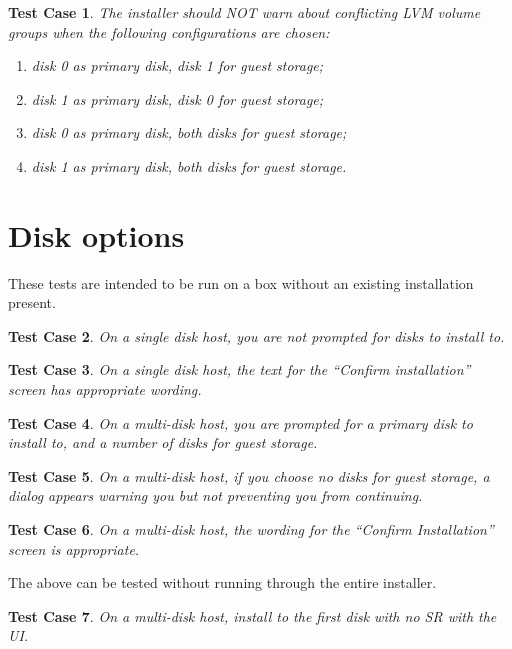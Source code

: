 \documentclass[a4paper]{article}
\newtheorem{testcase}{Test Case}
\begin{document}
\begin{testcase}
The installer should NOT warn about conflicting LVM volume groups when
the following configurations are chosen:
\begin{enumerate}
\item disk 0 as primary disk, disk 1 for guest storage;
\item disk 1 as primary disk, disk 0 for guest storage;
\item disk 0 as primary disk, both disks for guest storage;
\item disk 1 as primary disk, both disks for guest storage.
\end{enumerate}
\end{testcase}

\section{Disk options}

These tests are intended to be run on a box without an existing
installation present.

\begin{testcase}
On a single disk host, you are not prompted for disks to install to.
\end{testcase}

\begin{testcase}
On a single disk host, the text for the ``Confirm installation''
screen has appropriate wording.
\end{testcase}

\begin{testcase}
On a multi-disk host, you are prompted for a primary disk to install
to, and a number of disks for guest storage.
\end{testcase}

\begin{testcase}
On a multi-disk host, if you choose no disks for guest storage, a
dialog appears warning you but not preventing you from continuing.
\end{testcase}

\begin{testcase}
On a multi-disk host, the wording for the ``Confirm Installation''
screen is appropriate.
\end{testcase}

The above can be tested without running through the entire installer.

\begin{testcase}
On a multi-disk host, install to the first disk with no SR with the UI.
\end{testcase}
\end{document}

